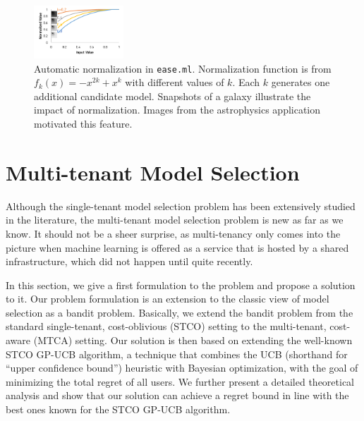 \documentclass[letterpaper]{vldb}
\newcommand{\eml}{\texttt{ease.ml}\xspace}
\begin{document}
\begin{figure}[t]
\centering
\includegraphics[width=0.3\textwidth]{figures/normalize}
\vspace{-2em}
\caption{Automatic normalization in \eml. Normalization function
is from $f_k(x) = -x^{2k} + x^{k}$ with different 
values of $k$. Each $k$ generates one additional candidate
model. Snapshots of a galaxy illustrate the impact of
normalization. Images from the astrophysics 
application~\cite{MNRAS} motivated this feature.}
 \label{fig:normalization}
\end{figure}






\section{Multi-tenant Model Selection}\label{sec:multitenant}

Although the single-tenant model selection problem has been extensively studied in the literature, the multi-tenant model selection problem is new as far as we know.
It should not be a sheer surprise, as multi-tenancy only comes into the picture when machine learning is offered as a service that is hosted by a shared infrastructure, which did not happen until quite recently.

In this section, we give a first formulation to the problem and propose a solution to it.
Our problem formulation is an extension to the classic view of model selection as a bandit problem.
Basically, we extend the bandit problem from the standard single-tenant, cost-oblivious (STCO) setting to the multi-tenant, cost-aware (MTCA) setting.
Our solution is then based on extending the well-known STCO GP-UCB algorithm, a technique that combines the UCB (shorthand for ``upper confidence bound'') heuristic with Bayesian optimization, with the goal of minimizing the total regret of all users.
We further present a detailed theoretical analysis and show that our solution can achieve a regret bound in line with the best ones known for the STCO GP-UCB algorithm.
\end{document}

